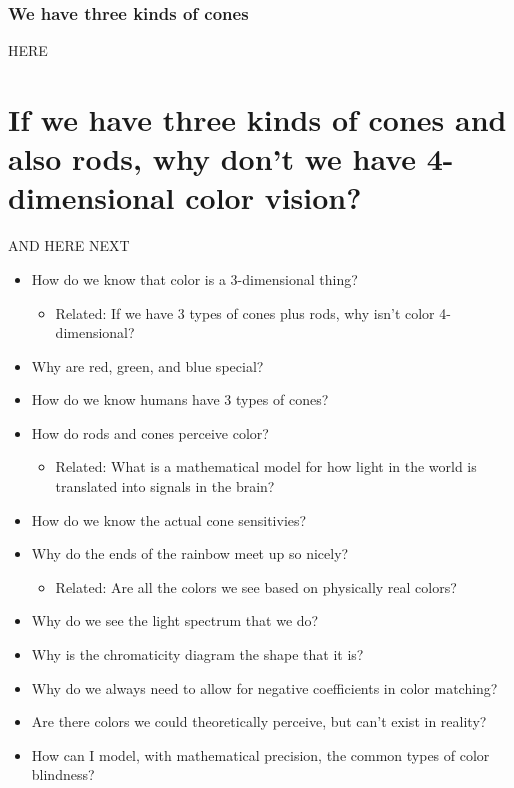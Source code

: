 \documentclass[
]{article}
\providecommand{\tightlist}{%
  \setlength{\itemsep}{0pt}\setlength{\parskip}{0pt}}
\begin{document}
\hypertarget{we-have-three-kinds-of-cones}{%
\subsubsection{We have three kinds of
cones}\label{we-have-three-kinds-of-cones}}

HERE

\hypertarget{if-we-have-three-kinds-of-cones-and-also-rods-why-dont-we-have-4-dimensional-color-vision}{%
\section{If we have three kinds of cones and also rods, why don't we
have 4-dimensional color
vision?}\label{if-we-have-three-kinds-of-cones-and-also-rods-why-dont-we-have-4-dimensional-color-vision}}

AND HERE NEXT

\begin{itemize}
\tightlist
\item
  How do we know that color is a 3-dimensional thing?

  \begin{itemize}
  \tightlist
  \item
    Related: If we have 3 types of cones plus rods, why isn't color
    4-dimensional?
  \end{itemize}
\item
  Why are red, green, and blue special?
\item
  How do we know humans have 3 types of cones?
\item
  How do rods and cones perceive color?

  \begin{itemize}
  \tightlist
  \item
    Related: What is a mathematical model for how light in the world is
    translated into signals in the brain?
  \end{itemize}
\item
  How do we know the actual cone sensitivies?
\item
  Why do the ends of the rainbow meet up so nicely?

  \begin{itemize}
  \tightlist
  \item
    Related: Are all the colors we see based on physically real colors?
  \end{itemize}
\item
  Why do we see the light spectrum that we do?
\item
  Why is the chromaticity diagram the shape that it is?
\item
  Why do we always need to allow for negative coefficients in color
  matching?
\item
  Are there colors we could theoretically perceive, but can't exist in
  reality?
\item
  How can I model, with mathematical precision, the common types of
  color blindness?
\end{itemize}
\end{document}
